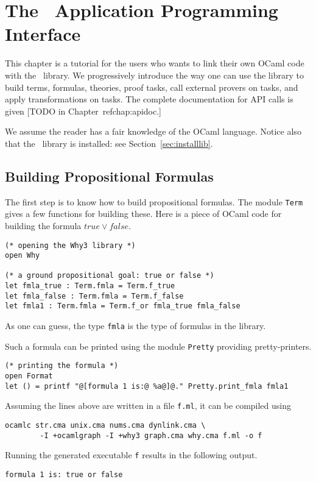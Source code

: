 \chapter{The \why\ Application Programming Interface}
\label{chap:api}

This chapter is a tutorial for the users who wants to link their own
OCaml code with the \why\ library. We progressively introduce the way
one can use the library to build terms, formulas, theories, proof
tasks, call external provers on tasks, and apply transformations on
tasks. The complete documentation for API calls is given 
[TODO in Chapter~ref{chap:apidoc}.]

We assume the reader has a fair knowledge of the OCaml
language. Notice also that the \why\ library is installed: see
Section~\ref{sec:installlib}.


\section{Building Propositional Formulas}

The first step is to know how to build propositional formulas. The
module \texttt{Term} gives a few functions for building these. Here is
a piece of OCaml code for building the formula $true \lor false$.
\begin{verbatim}
(* opening the Why3 library *)
open Why

(* a ground propositional goal: true or false *)
let fmla_true : Term.fmla = Term.f_true
let fmla_false : Term.fmla = Term.f_false
let fmla1 : Term.fmla = Term.f_or fmla_true fmla_false
\end{verbatim}
As one can guess, the type \texttt{fmla} is the type of formulas in
the library.

Such a formula can be printed using the module \texttt{Pretty}
providing pretty-printers.
\begin{verbatim}
(* printing the formula *)
open Format
let () = printf "@[formula 1 is:@ %a@]@." Pretty.print_fmla fmla1
\end{verbatim}

Assuming the lines above are written in a file \texttt{f.ml}, it can
be compiled using
\begin{verbatim}
ocamlc str.cma unix.cma nums.cma dynlink.cma \
        -I +ocamlgraph -I +why3 graph.cma why.cma f.ml -o f
\end{verbatim}
Running the generated executable \texttt{f} results in the following output.
\begin{verbatim}
formula 1 is: true or false
\end{verbatim}

